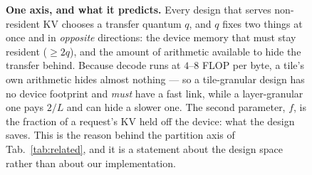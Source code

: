 \begin{figure}[t]
{}
\caption{\textbf{One axis, and what it predicts.} Every design that serves
non-resident KV chooses a transfer quantum $q$, and $q$ fixes two things at once
and in \emph{opposite} directions: the device memory that must stay resident
($\ge 2q$), and the amount of arithmetic available to hide the transfer behind.
Because decode runs at $4$--$8$ FLOP per byte, a tile's own arithmetic hides
almost nothing --- so a tile-granular design has no device footprint and
\emph{must} have a fast link, while a layer-granular one pays $2/L$ and can hide a
slower one. The second parameter, $f$, is the fraction of a request's KV held off
the device: what the design saves. This is the reason behind the partition axis of
Tab.~\ref{tab:related}, and it is a statement about the design space rather than
about our implementation.}
\label{fig:fq}
\end{figure}

